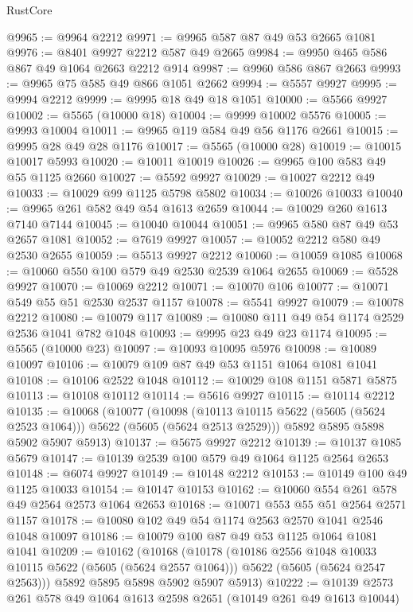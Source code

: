 \begin{lexlean}{RustCore}
\begin{coremodule}
@9965 := @9964 @2212
@9971 := @9965 @587 @87 @49 @53 @2665 @1081
@9976 := @8401 @9927 @2212 @587 @49 @2665
@9984 := @9950 @465 @586 @867 @49 @1064 @2663 @2212 @914
@9987 := @9960 @586 @867 @2663
@9993 := @9965 @75 @585 @49 @866 @1051 @2662
@9994 := @5557 @9927
@9995 := @9994 @2212
@9999 := @9995 @18 @49 @18 @1051
@10000 := @5566 @9927
@10002 := @5565 (@10000 @18)
@10004 := @9999 @10002 @5576
@10005 := @9993 @10004
@10011 := @9965 @119 @584 @49 @56 @1176 @2661
@10015 := @9995 @28 @49 @28 @1176
@10017 := @5565 (@10000 @28)
@10019 := @10015 @10017 @5993
@10020 := @10011 @10019
@10026 := @9965 @100 @583 @49 @55 @1125 @2660
@10027 := @5592 @9927
@10029 := @10027 @2212 @49
@10033 := @10029 @99 @1125 @5798 @5802
@10034 := @10026 @10033
@10040 := @9965 @261 @582 @49 @54 @1613 @2659
@10044 := @10029 @260 @1613 @7140 @7144
@10045 := @10040 @10044
@10051 := @9965 @580 @87 @49 @53 @2657 @1081
@10052 := @7619 @9927
@10057 := @10052 @2212 @580 @49 @2530 @2655
@10059 := @5513 @9927 @2212
@10060 := @10059 @1085
@10068 := @10060 @550 @100 @579 @49 @2530 @2539 @1064 @2655
@10069 := @5528 @9927
@10070 := @10069 @2212
@10071 := @10070 @106
@10077 := @10071 @549 @55 @51 @2530 @2537 @1157
@10078 := @5541 @9927
@10079 := @10078 @2212
@10080 := @10079 @117
@10089 := @10080 @111 @49 @54 @1174 @2529 @2536 @1041 @782 @1048
@10093 := @9995 @23 @49 @23 @1174
@10095 := @5565 (@10000 @23)
@10097 := @10093 @10095 @5976
@10098 := @10089 @10097
@10106 := @10079 @109 @87 @49 @53 @1151 @1064 @1081 @1041
@10108 := @10106 @2522 @1048
@10112 := @10029 @108 @1151 @5871 @5875
@10113 := @10108 @10112
@10114 := @5616 @9927
@10115 := @10114 @2212
@10135 := @10068
    (@10077
      (@10098 (@10113 @10115 @5622 (@5605 (@5624 @2523 @1064))) @5622 (@5605 (@5624 @2513 @2529)))
      @5892
      @5895
      @5898
      @5902
      @5907
      @5913)
@10137 := @5675 @9927 @2212
@10139 := @10137 @1085 @5679
@10147 := @10139 @2539 @100 @579 @49 @1064 @1125 @2564 @2653
@10148 := @6074 @9927
@10149 := @10148 @2212
@10153 := @10149 @100 @49 @1125 @10033
@10154 := @10147 @10153
@10162 := @10060 @554 @261 @578 @49 @2564 @2573 @1064 @2653
@10168 := @10071 @553 @55 @51 @2564 @2571 @1157
@10178 := @10080 @102 @49 @54 @1174 @2563 @2570 @1041 @2546 @1048 @10097
@10186 := @10079 @100 @87 @49 @53 @1125 @1064 @1081 @1041
@10209 := @10162
    (@10168
      (@10178
        (@10186 @2556 @1048 @10033 @10115 @5622 (@5605 (@5624 @2557 @1064)))
        @5622
        (@5605 (@5624 @2547 @2563)))
      @5892
      @5895
      @5898
      @5902
      @5907
      @5913)
@10222 := @10139 @2573 @261 @578 @49 @1064 @1613 @2598 @2651 (@10149 @261 @49 @1613 @10044)

\end{coremodule}
\end{lexlean}
